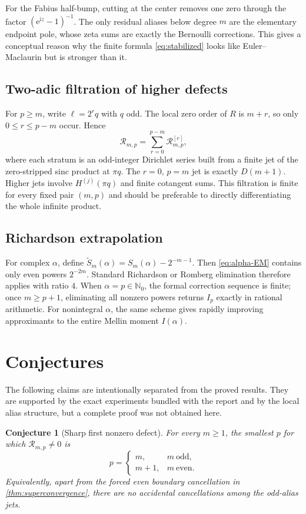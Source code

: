 \documentclass[11pt]{article}
\newtheorem{conjecture}[theorem]{Conjecture}
\theoremstyle{definition}
\theoremstyle{remark}
\newcommand{\e}{\mathrm e}
\newcommand{\ii}{\mathrm i}
\newcommand{\N}{\mathbb N}
\newcommand{\Rema}{\mathcal R}
\begin{document}
For the Fabius half-bump, cutting at the center removes one zero through the
factor $(\e^{\ii z}-1)^{-1}$.  The only residual aliases below degree $m$ are
the elementary endpoint pole, whose zeta sums are exactly the Bernoulli
corrections.  This gives a conceptual reason why the finite formula
\eqref{eq:stabilized} looks like Euler--Maclaurin but is stronger than it.

\subsection{Two-adic filtration of higher defects}

For $p\ge m$, write $\ell=2^rq$ with $q$ odd.  The local zero order of $R$ is
$m+r$, so only $0\le r\le p-m$ occur.  Hence
\[
 \Rema_{m,p}=\sum_{r=0}^{p-m}\Rema_{m,p}^{[r]},
\]
where each stratum is an odd-integer Dirichlet series built from a finite jet
of the zero-stripped sinc product at $\pi q$.  The $r=0$, $p=m$ jet is exactly
$D(m+1)$.  Higher jets involve $H^{(j)}(\pi q)$ and finite cotangent sums.  This
filtration is finite for every fixed pair $(m,p)$ and should be preferable to
directly differentiating the whole infinite product.

\subsection{Richardson extrapolation}

For complex $\alpha$, define $\widetilde S_m(\alpha)=S_m(\alpha)-2^{-m-1}$.
Then \eqref{eq:alpha-EM} contains only even powers $2^{-2m}$.  Standard
Richardson or Romberg elimination therefore applies with ratio $4$.  When
$\alpha=p\in\N_0$, the formal correction sequence is finite; once
$m\ge p+1$, eliminating all nonzero powers returns $I_p$ exactly in rational
arithmetic.  For nonintegral $\alpha$, the same scheme gives rapidly improving
approximants to the entire Mellin moment $I(\alpha)$.

\section{Conjectures}

The following claims are intentionally separated from the proved results.
They are supported by the exact experiments bundled with the report and by
the local alias structure, but a complete proof was not obtained here.

\begin{conjecture}[Sharp first nonzero defect]\label{conj:sharpness}
For every $m\ge1$, the smallest $p$ for which $\Rema_{m,p}\ne0$ is
\[
 p=\begin{cases}
 m,&m\ \text{odd},\\
 m+1,&m\ \text{even}.
 \end{cases}
\]
Equivalently, apart from the forced even boundary cancellation in
\cref{thm:superconvergence}, there are no accidental cancellations among the
odd-alias jets.
\end{conjecture}
\end{document}
